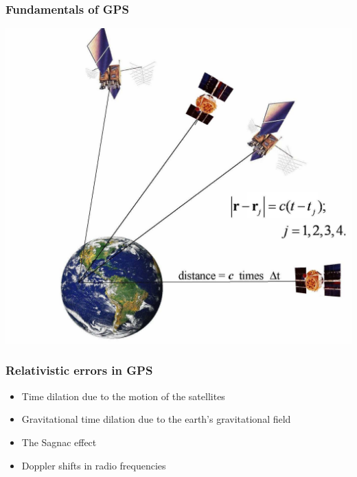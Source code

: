 \documentclass[xcolor=dvipsnames,usepdftitle=false]{beamer}
\begin{document}
\begin{frame}

\frametitle{Fundamentals of GPS}

\begin{center}

\includegraphics[scale=0.18]{images/eqn.png}

\end{center}

\end{frame}

\begin{frame}

\frametitle{Relativistic errors in GPS}

\begin{itemize}
	\item Time dilation due to the motion of the satellites \pause
	\item Gravitational time dilation due to the earth's gravitational field \pause
	\item The Sagnac effect \pause
	\item Doppler shifts in radio frequencies
\end{itemize}

\end{frame}
\end{document}
